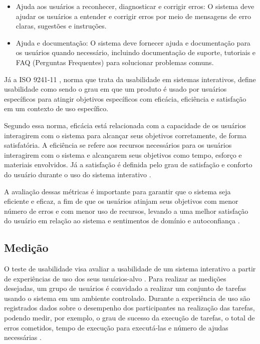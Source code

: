 \begin{description}
\begin{itemize}
            \item Ajuda aos usuários a reconhecer, diagnosticar e corrigir erros: O sistema deve ajudar os usuários a entender 
            e corrigir erros por meio de mensagens de erro claras, sugestões e instruções.

            \item Ajuda e documentação: O sistema deve fornecer ajuda e documentação para os usuários quando necessário, incluindo 
            documentação de suporte, tutoriais e FAQ (Perguntas Frequentes) para solucionar problemas comuns.
        \end{itemize}
\end{description}

Já a ISO 9241-11 \cite{iso9241}, norma que trata da usabilidade em sistemas interativos, define usabilidade como sendo o grau em que 
um produto é usado por usuários específicos para atingir objetivos específicos com eficácia, eficiência e satisfação em um contexto 
de uso específico.

Segundo essa norma, eficácia está relacionada com a capacidade de os usuários interagirem com o sistema para alcançar seus objetivos 
corretamente, de forma satisfatória. A eficiência se refere aos recursos necessários para os usuários interagirem 
com o sistema e alcançarem seus objetivos como tempo, esforço e materiais envolvidos. Já a satisfação é definida pelo grau de satisfação e 
conforto do usuário durante o uso do sistema interativo \cite{iso9241}.

A avaliação dessas métricas é importante para garantir que o sistema seja eficiente e eficaz, a fim de que os usuários atinjam seus objetivos 
com menor número de erros e com menor uso de recursos, levando a uma melhor satisfação do usuário em relação ao sistema e sentimentos de domínio 
e autoconfiança \cite{nielsen1994usability}.

\subsection{Medição}
\label{sec:Medição1}

O teste de usabilidade visa avaliar a usabilidade de um sistema interativo a partir de experiências de uso dos seus usuários-alvo \cite{rubin2011}. 
Para realizar as medições desejadas, um grupo de usuários é convidado a realizar um conjunto de tarefas usando o sistema em um ambiente controlado. Durante a experiência de 
uso são registrados dados sobre o desempenho dos participantes na realização das tarefas, podendo medir, por exemplo, o grau de sucesso da execução de tarefas, o total de 
erros cometidos, tempo de execução para executá-las e número de ajudas necessárias \cite{barbosa2010}.

